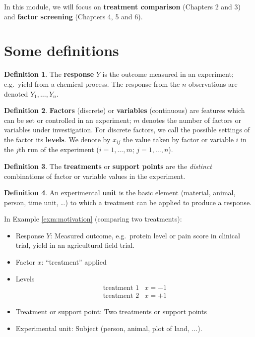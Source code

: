 \documentclass[
]{book}
\providecommand{\tightlist}{%
  \setlength{\itemsep}{0pt}\setlength{\parskip}{0pt}}
\theoremstyle{definition}
\newtheorem{definition}{Definition}[chapter]
\theoremstyle{definition}
\theoremstyle{definition}
\theoremstyle{definition}
\theoremstyle{remark}
\begin{document}
In this module, we will focus on \textbf{treatment comparison} (Chapters 2 and 3) and \textbf{factor screening} (Chapters 4, 5 and 6).

\hypertarget{some-definitions}{%
\section{Some definitions}\label{some-definitions}}

\begin{definition}
\protect\hypertarget{def:response}{}\label{def:response}The \textbf{response} \(Y\) is the outcome measured in an experiment; e.g.~yield from a chemical process. The response from the \(n\) observations are denoted \(Y_{1},\dots,Y_{n}\).
\end{definition}

\begin{definition}
\protect\hypertarget{def:factor-variable}{}\label{def:factor-variable}\textbf{Factors} (discrete) or \textbf{variables} (continuous) are features which can be set or controlled in an experiment; \(m\) denotes the number of factors or variables under investigation. For discrete factors, we call the possible settings of the factor its \textbf{levels}. We denote by \(x_{ij}\) the value taken by factor or variable \(i\) in the \(j\)th run of the experiment (\(i = 1, \ldots, m\); \(j = 1, \ldots, n\)).
\end{definition}

\begin{definition}
\protect\hypertarget{def:treatment}{}\label{def:treatment}The \textbf{treatments} or \textbf{support points} are the \emph{distinct} combinations of factor or variable values in the experiment.
\end{definition}

\begin{definition}
\protect\hypertarget{def:unit}{}\label{def:unit}An experimental \textbf{unit} is the basic element (material, animal, person, time unit, \ldots) to which a treatment can be applied to produce a response.
\end{definition}

In Example \ref{exm:motivation} (comparing two treatments):

\begin{itemize}
\tightlist
\item
  Response \(Y\): Measured outcome, e.g.~protein level or pain score in clinical trial, yield in an agricultural field trial.
\item
  Factor \(x\): ``treatment'' applied
\item
  Levels
  \[
  \begin{array}{ll}
  \textrm{treatment 1}&x =-1\\
  \textrm{treatment 2}&x =+1
  \end{array}
  \]
\item
  Treatment or support point: Two treatments or support points
\item
  Experimental unit: Subject (person, animal, plot of land, \(\ldots\)).
\end{itemize}
\end{document}
